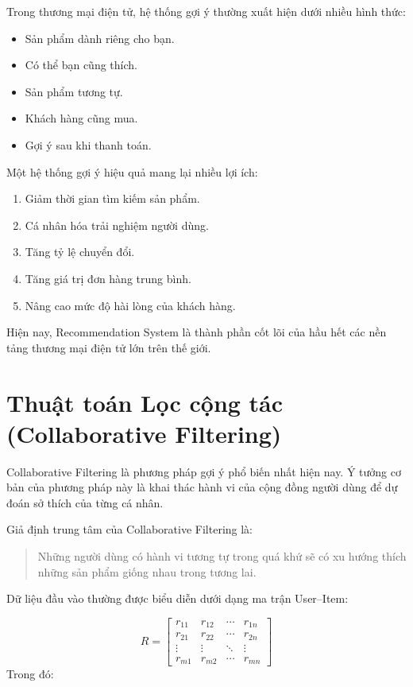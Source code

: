 \documentclass{report}
\begin{document}
Trong thương mại điện tử, hệ thống gợi ý thường xuất hiện dưới nhiều hình thức:

\begin{itemize}
\item Sản phẩm dành riêng cho bạn.
\item Có thể bạn cũng thích.
\item Sản phẩm tương tự.
\item Khách hàng cũng mua.
\item Gợi ý sau khi thanh toán.
\end{itemize}

Một hệ thống gợi ý hiệu quả mang lại nhiều lợi ích:

\begin{enumerate}
\item Giảm thời gian tìm kiếm sản phẩm.
\item Cá nhân hóa trải nghiệm người dùng.
\item Tăng tỷ lệ chuyển đổi.
\item Tăng giá trị đơn hàng trung bình.
\item Nâng cao mức độ hài lòng của khách hàng.
\end{enumerate}

Hiện nay, Recommendation System là thành phần cốt lõi của hầu hết các nền tảng thương mại điện tử lớn trên thế giới.

\section{Thuật toán Lọc cộng tác (Collaborative Filtering)}

Collaborative Filtering là phương pháp gợi ý phổ biến nhất hiện nay. Ý tưởng cơ bản của phương pháp này là khai thác hành vi của cộng đồng người dùng để dự đoán sở thích của từng cá nhân.

Giả định trung tâm của Collaborative Filtering là:

\begin{quote}
Những người dùng có hành vi tương tự trong quá khứ sẽ có xu hướng thích những sản phẩm giống nhau trong tương lai.
\end{quote}

Dữ liệu đầu vào thường được biểu diễn dưới dạng ma trận User--Item:

\[
R =
\begin{bmatrix}
r_{11} & r_{12} & \cdots & r_{1n} \\
r_{21} & r_{22} & \cdots & r_{2n} \\
\vdots & \vdots & \ddots & \vdots \\
r_{m1} & r_{m2} & \cdots & r_{mn}
\end{bmatrix}
\]
Trong đó:
\end{document}
